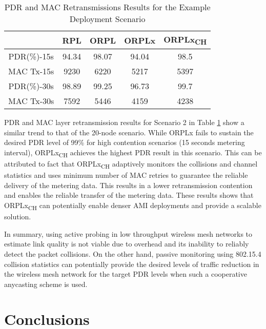 \documentclass[conference]{IEEEtran}
\begin{document}
\begin{table}[htb]
\caption{PDR and MAC Retransmissions Results for the Example Deployment Scenario }
\label{tab.exp-deployment}
\begin{center}
\begin{tabular}{|c|c|c|c|c|}
\hline &RPL & ORPL & ORPLx & ORPLx\textsubscript{CH} \\
\hline PDR(\%)-15s & 94.34 & 98.07 & 94.04 & 98.5  \\
\hline MAC Tx-15s & 9230 & 6220 & 5217 & 5397 \\
\hline PDR(\%)-30s & 98.89 & 99.25 & 96.73 & 99.7  \\
\hline MAC Tx-30s & 7592 & 5446 & 4159 & 4238 \\
\hline
\end{tabular}
\end{center}
\end{table}

PDR and MAC layer retransmission results for Scenario 2 in Table \ref{tab.exp-deployment} show a similar trend to that of the 20-node scenario. While ORPLx fails to sustain the desired PDR level of 99\% for high contention scenarios (15 seconds metering interval),  ORPLx\textsubscript{CH} achieves the highest PDR result in this scenario. This can be attributed to fact that  ORPLx\textsubscript{CH} adaptively monitors the collisions and channel statistics and uses minimum number of MAC retries to guarantee the reliable delivery of the metering data. This results in a lower retransmission contention and enables the reliable transfer of the metering data. These results shows that  ORPLx\textsubscript{CH} can potentially enable denser AMI deployments and provide a scalable solution.

In summary, using active probing in low throughput wireless mesh networks to estimate link quality is not viable due to overhead and its inability to reliably detect the packet collisions. On the other hand, passive monitoring using 802.15.4 collision statistics can potentially provide the desired levels of traffic reduction in the wireless mesh network for the target PDR levels when such a cooperative anycasting scheme is used.

\section{Conclusions} \label{conclusion}
\end{document}

